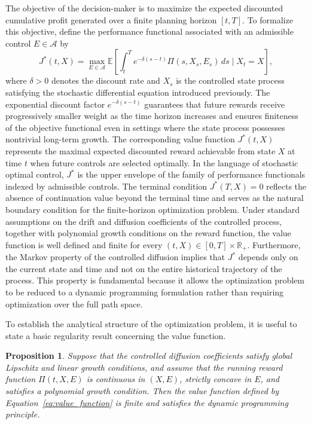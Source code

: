 \documentclass[11pt]{article}
\newtheorem{prop}[theorem]{\bf Proposition}
\begin{document}
	The objective of the decision-maker is to maximize the expected discounted cumulative profit generated over a finite planning horizon $[t,T]$. To formalize this objective, define the performance functional associated with an admissible control $E\in\mathcal{A}$ by
	\begin{equation}
		J^*(t,X)=
		\max_{E\in\mathcal{A}}
		\mathbb{E}
		\left[
		\int_t^T e^{-\delta(s-t)}
		\Pi(s,X_s,E_s)\,ds
		\mid X_t=X
		\right],
		\label{eq:value_function}
	\end{equation}
	where $\delta>0$ denotes the discount rate and $X_s$ is the controlled state process satisfying the stochastic differential equation introduced previously. The exponential discount factor $e^{-\delta(s-t)}$ guarantees that future rewards receive progressively smaller weight as the time horizon increases and ensures finiteness of the objective functional even in settings where the state process possesses nontrivial long-term growth. The corresponding value function $J^*(t,X)$ represents the maximal expected discounted reward achievable from state $X$ at time $t$ when future controls are selected optimally. In the language of stochastic optimal control, $J^*$ is the upper envelope of the family of performance functionals indexed by admissible controls. The terminal condition $J^*(T,X)=0$
	reflects the absence of continuation value beyond the terminal time and serves as the natural boundary condition for the finite-horizon optimization problem. Under standard assumptions on the drift and diffusion coefficients of the controlled process, together with polynomial growth conditions on the reward function, the value function is well defined and finite for every $(t,X)\in[0,T]\times\mathbb{R}_+$. Furthermore, the Markov property of the controlled diffusion implies that $J^*$ depends only on the current state and time and not on the entire historical trajectory of the process. This property is fundamental because it allows the optimization problem to be reduced to a dynamic programming formulation rather than requiring optimization over the full path space.
	
	To establish the analytical structure of the optimization problem, it is useful to state a basic regularity result concerning the value function.
	
	\begin{prop}\label{p1}
		Suppose that the controlled diffusion coefficients satisfy global Lipschitz and linear growth conditions, and assume that the running reward function $\Pi(t,X,E)$ is continuous in $(X,E)$, strictly concave in $E$, and satisfies a polynomial growth condition. Then the value function defined by Equation~\eqref{eq:value_function} is finite and satisfies the dynamic programming principle.
	\end{prop}
	
\end{document}
